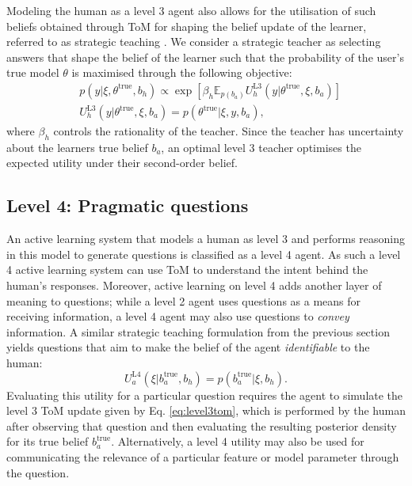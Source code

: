 \documentclass[letterpaper]{article} %
\begin{document}
Modeling the human as a level 3 agent also allows for the utilisation of such beliefs obtained through ToM for shaping the belief update of the learner, referred to as strategic teaching \cite{peltola2019machine}. We consider a strategic teacher as selecting answers that shape the belief of the learner such that the probability of the user's true model $\theta$ is maximised through the following objective:
\begin{align}
    &p(y | \xi, \theta^{\text{true}}, b_h) \propto \exp \left[ \beta_h \mathbb{E}_{p(b_a)}U^{\text{L3}}_h(y | \theta^{\text{true}}, \xi, b_a)\right] \\
    &U^{\text{L3}}_h(y | \theta^{\text{true}}, \xi, b_a) = p(\theta^{\text{true}} | \xi, y, b_a) \label{eq:L3_objective},
\end{align}
where $\beta_h$ controls the rationality of the teacher.
Since the teacher has uncertainty about the learners true belief $b_a$, an optimal level 3 teacher optimises the expected utility under their second-order belief.

\subsection{Level 4: Pragmatic questions}

An active learning system that models a human as level 3 and performs reasoning in this model to generate questions is classified as a level 4 agent. As such a level 4 active learning system can use ToM to understand the intent behind the human's responses. Moreover, active learning on level 4 adds another layer of meaning to questions; while a level 2 agent uses questions as a means for receiving information, a level 4 agent may also use questions to \textit{convey} information. A similar strategic teaching formulation from the previous section yields questions that aim to make the belief of the agent \textit{identifiable} to the human:
\begin{equation}
    U^{\text{L4}}_a(\xi | b^{\text{true}}_a, b_h) = p(b^{\text{true}}_a| \xi, b_h).
\end{equation}
Evaluating this utility for a particular question requires the agent to simulate the level 3 ToM update given by Eq. \ref{eq:level3tom}, which is performed by the human after observing that question and then evaluating the resulting posterior density for its true belief $b_a^{\text{true}}$. Alternatively, a level 4 utility may also be used for communicating the relevance of a particular feature or model parameter through the question.
\end{document}
